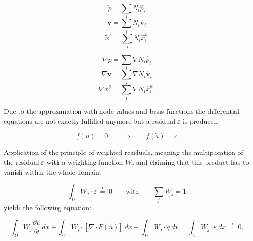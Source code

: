 \begin{minipage}[b]{0.47\textwidth}
\begin{equation}
\label{eq:p}
	\tilde p = \sum_i N_i \hat{p}_i
\end{equation}
\begin{equation}
\label{eq:v}
	\tilde{\mathbf v} = \sum_i N_i \hat{\mathbf v}_i
\end{equation}
\begin{equation}
\label{eq:x}
	\tilde x^\kappa  = \sum_i N_i \hat x_i^\kappa
\end{equation}
\end{minipage}
\hfill
\begin{minipage}[b]{0.47\textwidth}
\begin{equation}
\label{eq:dp}
	\nabla \tilde p = \sum_i \nabla N_i \hat{p}_i
\end{equation}
\begin{equation}
\label{eq:dv}
	\nabla \tilde{\mathbf v} = \sum_i \nabla N_i \hat{\mathbf v}_i
\end{equation}
\begin{equation}
\label{eq:dx}
	\nabla \tilde x^\kappa  = \sum_i \nabla N_i \hat x_i^\kappa .
\end{equation}
\end{minipage}

Due to the approximation with node values and basis functions the differential
equations are not exactly fulfilled anymore but a residual $\varepsilon$ is produced.

\begin{equation}
	f(u) = 0  \qquad \Rightarrow \qquad f(\tilde u) = \varepsilon
\end{equation}

Application of the principle of weighted residuals, meaning the multiplication
of the residual $\varepsilon$ with a weighting function $W_j$  and claiming that
this product has to vanish within the whole domain,

\begin{equation}
	\int_\Omega W_j \cdot \varepsilon \: \overset {!}{=} \: 0 \qquad \textrm{with} \qquad \sum_j W_j =1
\end{equation}
yields the following equation:

\begin{equation}
	\int_\Omega W_j \frac{\partial \tilde u}{\partial t} \: dx + \int_\Omega W_j
	\cdot \left[ \nabla \cdot F(\tilde u) \right]  \: dx - \int_\Omega W_j
	\cdot q \: dx = \int_\Omega W_j \cdot \varepsilon \: dx \: \overset {!}{=} \: 0.	
\label{eq:weightedResidual}	
\end{equation}

